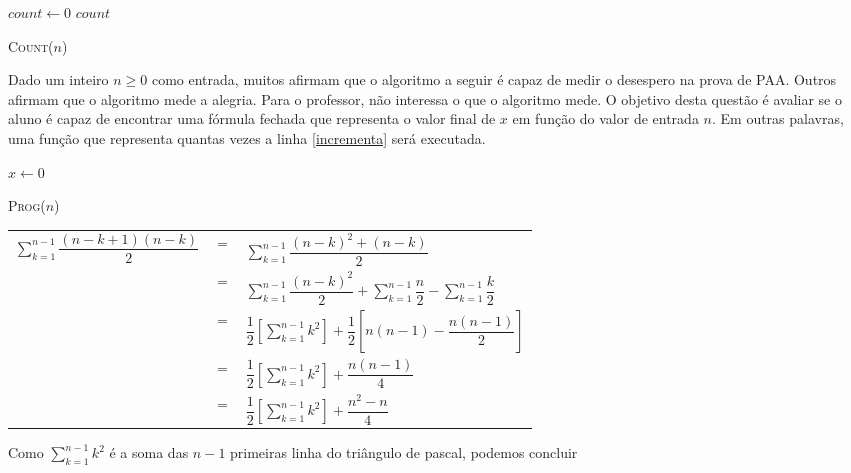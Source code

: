 \documentclass[a4paper]{exam}
\begin{document}
\begin{questions}
  \begin{algorithm}[H]
    \NoCaptionOfAlgo
    \DontPrintSemicolon

    $count \gets 0$\;
    \Return $count$\;
    \caption{\textsc{Count}($n$)}
  \end{algorithm}
  \question Dado um inteiro $n \geq 0$ como entrada, muitos
  afirmam que o algoritmo a seguir é capaz de medir o desespero na
  prova de PAA. Outros afirmam que o algoritmo mede a alegria. Para
  o professor, não interessa o que o algoritmo mede. O objetivo
  desta questão é avaliar se o aluno é capaz de encontrar uma
  fórmula fechada que representa o valor final de $x$ em função do
  valor de entrada $n$. Em outras palavras, uma função que
  representa quantas vezes a linha \ref{incrementa} será executada.

  \begin{algorithm}[H]
    \NoCaptionOfAlgo
    \DontPrintSemicolon

    $x \gets 0$\;
    \caption{\textsc{Prog}($n$)}
  \end{algorithm}
  \begin{solution}
    \begin{tabular}{lll}
      $ \displaystyle\sum_{k=1}^{n-1} \dfrac{(n-k+1)(n-k)}{2} $&  $=$ &$ \displaystyle\sum_{k=1}^{n-1} \dfrac{(n-k)^2 + (n-k)}{2} $\\
      {}& $=$ &$ \displaystyle\sum_{k=1}^{n-1} \dfrac{(n-k)^2}{2} + \displaystyle\sum_{k=1}^{n-1}  \dfrac{n}{2} - \displaystyle\sum_{k=1}^{n-1} \dfrac{k}{2} $ \\
      {}& $=$ &$ \dfrac{1}{2}\left[ \displaystyle\sum_{k=1}^{n-1} k ^2 \right] + \dfrac{1}{2} \left[ n(n-1) - \dfrac{n(n-1)}{2} \right]  $\\ 
      {}& $=$ &$ \dfrac{1}{2} \left[ \displaystyle\sum_{k=1}^{n-1} k^2 \right] + \dfrac{n(n-1)}{4} $\\
      {}& $=$ &$ \dfrac{1}{2} \left[ \displaystyle\sum_{k=1}^{n-1} k^2 \right] + \dfrac{n^2 -n}{4} $\\
    \end{tabular}

      Como $\displaystyle\sum_{k=1}^{n-1} k^2 $ é a soma das $n-1$  primeiras linha do triângulo de pascal, podemos concluir


\end{solution}
\end{questions}
\end{document}
